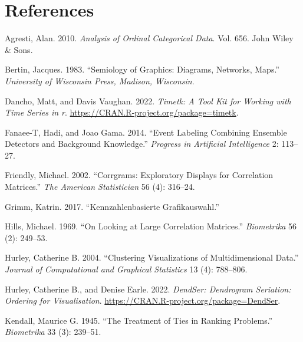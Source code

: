 \hypertarget{references}{%
\section*{References}\label{references}}

\hypertarget{refs}{}
\begin{CSLReferences}{1}{0}
\leavevmode{}%
Agresti, Alan. 2010. \emph{Analysis of Ordinal Categorical Data}. Vol. 656. John Wiley \& Sons.

\leavevmode{}%
Bertin, Jacques. 1983. {``Semiology of Graphics: Diagrams, Networks, Maps.''} \emph{University of Wisconsin Press, Madison, Wisconsin}.

\leavevmode{}%
Dancho, Matt, and Davis Vaughan. 2022. \emph{Timetk: A Tool Kit for Working with Time Series in r}. \url{https://CRAN.R-project.org/package=timetk}.

\leavevmode{}%
Fanaee-T, Hadi, and Joao Gama. 2014. {``Event Labeling Combining Ensemble Detectors and Background Knowledge.''} \emph{Progress in Artificial Intelligence} 2: 113--27.

\leavevmode{}%
Friendly, Michael. 2002. {``Corrgrams: Exploratory Displays for Correlation Matrices.''} \emph{The American Statistician} 56 (4): 316--24.

\leavevmode{}%
Grimm, Katrin. 2017. {``Kennzahlenbasierte Grafikauswahl.''}

\leavevmode{}%
Hills, Michael. 1969. {``On Looking at Large Correlation Matrices.''} \emph{Biometrika} 56 (2): 249--53.

\leavevmode{}%
Hurley, Catherine B. 2004. {``Clustering Visualizations of Multidimensional Data.''} \emph{Journal of Computational and Graphical Statistics} 13 (4): 788--806.

\leavevmode{}%
Hurley, Catherine B., and Denise Earle. 2022. \emph{DendSer: Dendrogram Seriation: Ordering for Visualisation}. \url{https://CRAN.R-project.org/package=DendSer}.

\leavevmode{}%
Kendall, Maurice G. 1945. {``The Treatment of Ties in Ranking Problems.''} \emph{Biometrika} 33 (3): 239--51.


\end{CSLReferences}
